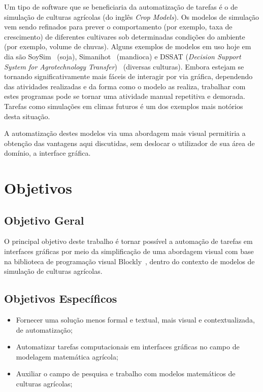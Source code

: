 \documentclass[tg]{mdtufsm}
\begin{document}
        Um tipo de software que se beneficiaria da automatização de tarefas é o de simulação de culturas agrícolas (do inglês \emph{Crop Models}). Os modelos de simulação vem sendo refinados para prever o comportamento (por exemplo, taxa de crescimento) de diferentes cultivares sob determinadas condições do ambiente (por exemplo, volume de chuvas). Alguns exemplos de modelos em uso hoje em dia são SoySim~\cite{SoySim} (soja), Simanihot~\cite{Simanihot} (mandioca) e DSSAT (\emph{Decision Support System for Agrotechnology Transfer})~\cite{dssat} (diversas culturas). Embora estejam se tornando significativamente mais fáceis de interagir por via gráfica, dependendo das atividades realizadas e da forma como o modelo as realiza, trabalhar com estes programas pode se tornar uma atividade manual repetitiva e demorada. Tarefas como simulações em climas futuros é um dos exemplos mais notórios desta situação.

        A automatização destes modelos via uma abordagem mais visual permitiria a obtenção das vantagens aqui discutidas, sem deslocar o utilizador de sua área de domínio, a interface gráfica.

    	\section{Objetivos}

        	\subsection{Objetivo Geral}

            	O principal objetivo deste trabalho é tornar possível a automação de tarefas em interfaces gráficas por meio da simplificação de uma abordagem visual com base na biblioteca de programação visual Blockly~\cite{BlocklyResource}, dentro do contexto de modelos de simulação de culturas agrícolas.

        	\subsection{Objetivos Específicos}

            	\begin{itemize}
            		\item Fornecer uma solução menos formal e textual, mais visual e contextualizada, de automatização;
            		\item Automatizar tarefas computacionais em interfaces gráficas no campo de modelagem matemática agrícola;
            		\item Auxiliar o campo de pesquisa e trabalho com modelos matemáticos de culturas agrícolas;
            	\end{itemize}
\end{document}
